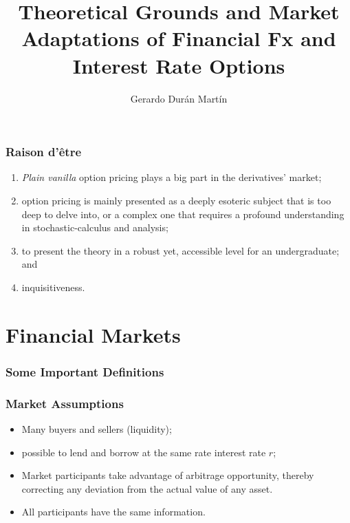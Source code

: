 \documentclass{beamer}
\title{Theoretical Grounds and Market Adaptations of Financial Fx and Interest Rate Options}
\author{Gerardo Dur\'an Mart\'in}
\institute{Universidad Marista}
\begin{document}
\frame{\titlepage}

\begin{frame}
	\frametitle{Raison d'\^etre}
	\begin{enumerate}
		\item<1-> \textit{Plain vanilla} option pricing plays a big part in the derivatives' market;
		\item<2-> option pricing is mainly presented as a deeply esoteric subject that is too deep to delve into, or a complex one that requires a profound understanding in stochastic-calculus and analysis;
		\item<3-> to present the theory in a robust yet, accessible level for an undergraduate; and
		\item<4-> inquisitiveness.
	\end{enumerate}
\end{frame}

\section{Financial Markets}

\begin{frame}
\frametitle{Some Important Definitions}



\end{frame}


\begin{frame}
\frametitle{Market Assumptions}
\begin{itemize}
	\item Many buyers and sellers (liquidity);
	\item possible to lend and borrow at the same rate interest rate $r$;
	\item Market participants take advantage of arbitrage opportunity, thereby correcting any deviation from the actual value of any asset.
	\item All participants have the same information.
\end{itemize}
\end{frame}
\end{document}
